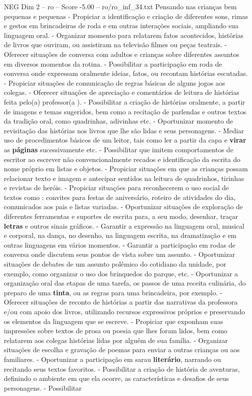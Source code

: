 \begin{textsample}{NEG Dim 2 – ro – Score -5.00 – ro/ro\_inf\_34.txt}  \label{ex:f2_neg_102}
Pensando nas crianças bem pequenas e pequenas - Propiciar a identificação e criação de diferentes sons, rimas e gestos em brincadeiras de roda e em outras interações sociais, ampliando sua linguagem oral. - Organizar momento para relatarem fatos acontecidos, histórias de livros que ouviram, ou assistiram na televisão filmes ou peças teatrais. - Oferecer situações de conversa com adultos e crianças sobre diferentes assuntos em diversos momentos da rotina. - Possibilitar a participação em roda de conversa onde expressam oralmente ideias, fatos, ou recontam histórias escutadas. - Propiciar situações de comunicação de regras básicas de alguns jogos aos colegas. - Oferecer situações de apreciação e comentários de leitura de histórias feita pelo(a) professor(a ). - Possibilitar a criação de histórias oralmente, a partir de imagens e temas sugeridos, bem como a recitação de parlendas e outros textos da tradição oral, como quadrinhas, adivinhas etc. - Oportunizar momento de revisitação das histórias nos livros que lhe são lidas e seus personagens. - Mediar uso de procedimentos básicos de um leitor, tais como ler a partir da capa e \textbf{virar} as \textbf{páginas} sucessivamente etc. - Possibilitar que imitem comportamentos de escritor ao escrever não convencionalmente recados e identificação da escrita do nome próprio em listas e objetos. - Propiciar situações em que as crianças possam relacionar texto e imagem e antecipar sentidos na leitura de quadrinhos, tirinhas e revistas de heróis. - Propiciar situações para reconhecerem o uso social de textos como : convites para festas de aniversário, roteiro de atividades do dia, comunicados aos pais e listas variadas. - Oportunizar situações de exploração de diferentes ferramentas e suportes de escrita para, a seu modo, desenhar, traçar \textbf{letras} e outros sinais gráficos. - Garantir a expressão na linguagem oral, musical e corporal, na dança, no desenho, na linguagem escrita, na dramatização e em outras linguagens em vários momentos. - Garantir a participação em rodas de conversa onde discutem seus pontos de vista sobre um assunto. - Oportunizar situações de debates de um assunto polêmico do cotidiano da unidade, por exemplo, como organizar o uso dos brinquedos do parque, etc. - Oportunizar a organização oral das etapas de uma tarefa, os passos de uma receita culinária, do preparo de uma \textbf{tinta}, ou as regras para uma brincadeira, por exemplo. - Oferecer situações de reconto de histórias a partir das narrativas da professora e/ou com apoio dos livros, utilizando recursos expressivos próprios e preservando os elementos da linguagem que se escreve. - Propiciar que exponham suas impressões sobre textos de prosa ou poesia que lhes foram lidos, bem como relatarem aos colegas histórias lidas por alguém de sua família. - Organizar situações de escolha e gravação de poemas para enviar a outras crianças ou aos familiares. - Oportunizar a participação em sarau \textbf{literário}, narrando ou recitando seus textos favoritos. - Possibilitar a criação de história de aventuras, definindo o ambiente em que ela ocorre, as características e desafios de seus personagens. - Possibilitar 
\end{textsample}

